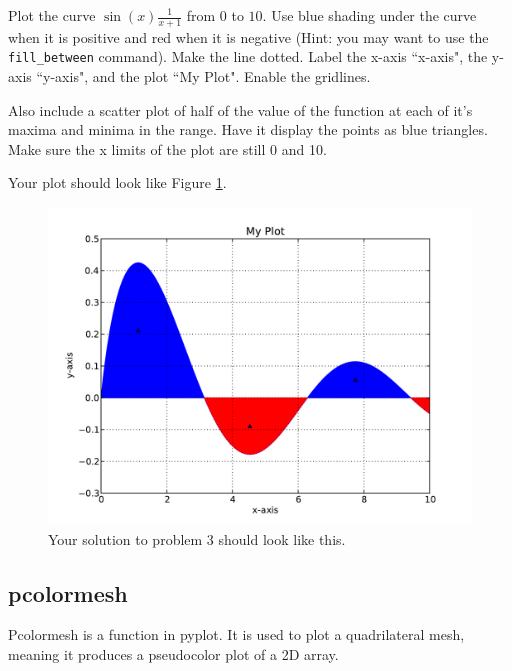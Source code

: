 \begin{problem} Plot the curve $\sin(x)\frac{1}{x+1}$ from $0$ to $10$.
Use blue shading under the curve when it is positive and red when it is
negative (Hint: you may want to use the \verb!fill_between! command).
Make the line dotted. Label the x-axis ``x-axis", the y-axis ``y-axis",
and the plot ``My Plot". Enable the gridlines.

Also include a scatter plot of half of the value of the function at each
of it's maxima and minima in the range. Have it display the points as
blue triangles. Make sure the x limits of the plot are still 0 and 10.

Your plot should look like Figure \ref{mpl:problem3}.
\end{problem}

\begin{figure}
\includegraphics[width=\textwidth]{prob3.pdf}
\caption{Your solution to problem 3 should look like this.}
\label{mpl:problem3} 
\end{figure}

\subsection*{pcolormesh}
Pcolormesh is a function in pyplot. It is used to plot a quadrilateral mesh, 
meaning it produces a pseudocolor plot of a 2D array. 

